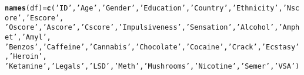 \documentclass{article}\usepackage[]{graphicx}\usepackage[]{color}
\makeatletter
\newcommand{\hlstr}[1]{\textcolor[rgb]{0.192,0.494,0.8}{#1}}%
\newcommand{\hlstd}[1]{\textcolor[rgb]{0.345,0.345,0.345}{#1}}%
\newcommand{\hlkwb}[1]{\textcolor[rgb]{0.69,0.353,0.396}{#1}}%
\newcommand{\hlkwd}[1]{\textcolor[rgb]{0.737,0.353,0.396}{\textbf{#1}}}%
\newenvironment{kframe}{%
 \def\at@end@of@kframe{}%
 \ifinner\ifhmode%
  \def\at@end@of@kframe{\end{minipage}}%
  \begin{minipage}{\columnwidth}%
 \fi\fi%
 \def\FrameCommand##1{\hskip\@totalleftmargin \hskip-\fboxsep
 \colorbox{shadecolor}{##1}\hskip-\fboxsep
     \hskip-\linewidth \hskip-\@totalleftmargin \hskip\columnwidth}%
 \MakeFramed {\advance\hsize-\width
   \@totalleftmargin\z@ \linewidth\hsize
   \@setminipage}}%
 {\par\unskip\endMakeFramed%
 \at@end@of@kframe}
\newenvironment{knitrout}{}{} %
\makeatother
\begin{document}
\begin{knitrout}
\color{fgcolor}\begin{kframe}
\begin{alltt}
\hlkwd{names}\hlstd{(df)} \hlkwb{=}\hlkwd{c}\hlstd{(}\hlstr{'ID'}\hlstd{,}\hlstr{'Age'}\hlstd{,}\hlstr{'Gender'}\hlstd{,} \hlstr{'Education'}\hlstd{,} \hlstr{'Country'}\hlstd{,} \hlstr{'Ethnicity'}\hlstd{,} \hlstr{'Nscore'}\hlstd{,} \hlstr{'Escore'}\hlstd{,}
             \hlstr{'Oscore'}\hlstd{,} \hlstr{'Ascore'}\hlstd{,} \hlstr{'Cscore'}\hlstd{,} \hlstr{'Impulsiveness'}\hlstd{,} \hlstr{'Sensation'}\hlstd{,}\hlstr{'Alcohol'}\hlstd{,} \hlstr{'Amphet'}\hlstd{,} \hlstr{'Amyl'}\hlstd{,}
             \hlstr{'Benzos'}\hlstd{,} \hlstr{'Caffeine'}\hlstd{,} \hlstr{'Cannabis'}\hlstd{,} \hlstr{'Chocolate'}\hlstd{,} \hlstr{'Cocaine'}\hlstd{,} \hlstr{'Crack'}\hlstd{,} \hlstr{'Ecstasy'}\hlstd{,} \hlstr{'Heroin'}\hlstd{,}
          \hlstr{'Ketamine'}\hlstd{,} \hlstr{'Legals'}\hlstd{,} \hlstr{'LSD'}\hlstd{,} \hlstr{'Meth'}\hlstd{,} \hlstr{'Mushrooms'}\hlstd{,} \hlstr{'Nicotine'}\hlstd{,} \hlstr{'Semer'}\hlstd{,} \hlstr{'VSA'}\hlstd{)}
\end{alltt}
\end{kframe}
\end{knitrout}
\end{document}
